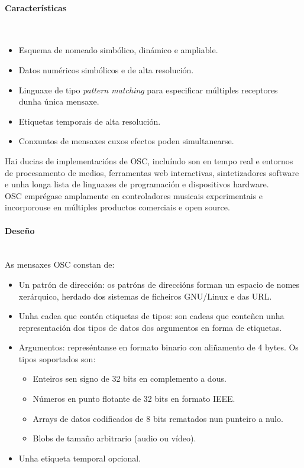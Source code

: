   \paragraph{Características}\mbox{}\\

  \begin{itemize}
   \item Esquema de nomeado simbólico, dinámico e ampliable.
   \item Datos numéricos simbólicos e de alta resolución.
   \item Linguaxe de tipo \textit{pattern matching} para especificar múltiples
         receptores dunha única mensaxe.
   \item Etiquetas temporais de alta resolución.
   \item Conxuntos de mensaxes cuxos efectos poden simultanearse.
  \end{itemize}

  Hai ducias de implementacións de OSC, incluíndo son en tempo real e entornos
  de procesamento de medios, ferramentas web interactivas, sintetizadores
  software e unha longa lista de linguaxes de programación e dispositivos
  hardware. \\

  OSC emprégase amplamente en controladores musicais experimentais e
  incorporouse en múltiples productos comerciais e open source.

  \paragraph{Deseño}\mbox{}\\

  As mensaxes OSC constan de:

  \begin{itemize}
   \item Un patrón de dirección: os patróns de direccións forman un espacio de
         nomes xerárquico, herdado dos sistemas de ficheiros GNU/Linux e das
         URL.
   \item Unha cadea que contén etiquetas de tipos: son cadeas que conteñen unha
         representación dos tipos de datos dos argumentos en forma de etiquetas.
   \item Argumentos: represéntanse en formato binario con aliñamento de 4
         bytes. Os tipos soportados son:
         \begin{itemize}
          \item Enteiros sen signo de 32 bits en complemento a dous.
          \item Números en punto flotante de 32 bits en formato IEEE.
          \item Arrays de datos codificados de 8 bits rematados nun punteiro a nulo.
          \item Blobs de tamaño arbitrario (audio ou vídeo).
         \end{itemize}
   \item Unha etiqueta temporal opcional.
  \end{itemize}

